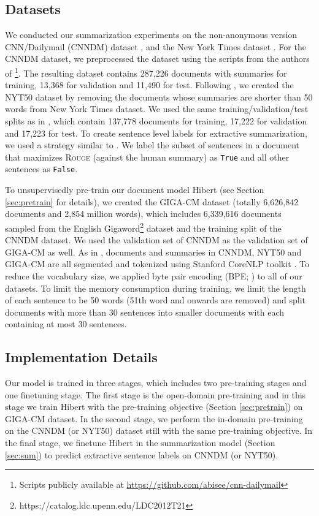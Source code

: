 \documentclass[11pt,a4paper]{article}
\begin{document}
\subsection{Datasets}
\label{sec:dataset}
We conducted our summarization experiments on the non-anonymous version CNN/Dailymail (\mbox{CNNDM}) dataset \cite{hermann:2015:nips,see:2017:acl}, and the New York Times dataset \cite{durrett:2016:acl,xu:2019:arxiv}. For the CNNDM dataset, we preprocessed the dataset using the scripts from the authors of \footnote{Scripts publicly available at {\url{https://github.com/abisee/cnn-dailymail}} }. The resulting dataset contains 287,226 documents with summaries for training, 13,368 for validation and 11,490 for test. 
Following \cite{xu:2019:arxiv,durrett:2016:acl}, we created the NYT50 dataset by removing the documents whose summaries are shorter than 50 words from New York Times dataset. We used the same training/validation/test splits as in , which contain 137,778 documents for training, 17,222 for validation and 17,223 for test.
To create sentence level labels for extractive summarization,
we used a strategy similar to . We label
the subset of sentences in a document that maximizes \textsc{Rouge} \cite{lin:2004:acl:w}
(against the human summary) as {\tt True} and all other sentences as
{\tt False}.

To unsupervisedly pre-train our document model {\sc Hibert} (see Section \ref{sec:pretrain} for details), we created the GIGA-CM dataset (totally 6,626,842 documents and 2,854 million words), which includes 6,339,616 documents sampled from the English Gigaword\footnote{https://catalog.ldc.upenn.edu/LDC2012T21} dataset and the training split of the \mbox{CNNDM} dataset. We used the validation set of CNNDM as the validation set of GIGA-CM as well. As in , documents and summaries in CNNDM, NYT50 and GIGA-CM are all segmented and tokenized using Stanford CoreNLP toolkit \cite{manning:2014:acldemo}.  To reduce the vocabulary size, we applied byte pair encoding (BPE; \citealt{sennrich:2016:acl}) to all of our datasets. To limit the memory consumption during training, we limit the length of each sentence to be 50 words (51th word and onwards are removed) and split documents with more than 30 sentences into smaller documents with each containing at most 30 sentences. 

\subsection{Implementation Details}
Our model is trained in three stages, which includes two pre-training stages and one finetuning stage. The first stage is the open-domain pre-training and in this stage we train {\sc Hibert} with the pre-training objective (Section \ref{sec:pretrain}) on GIGA-CM dataset. In the second stage, we perform the in-domain pre-training on the CNNDM (or NYT50) dataset still with the same pre-training objective. In the final stage, we finetune {\sc Hibert} in the summarization model (Section \ref{sec:sum}) to predict extractive sentence labels on CNNDM (or NYT50).
\end{document}
